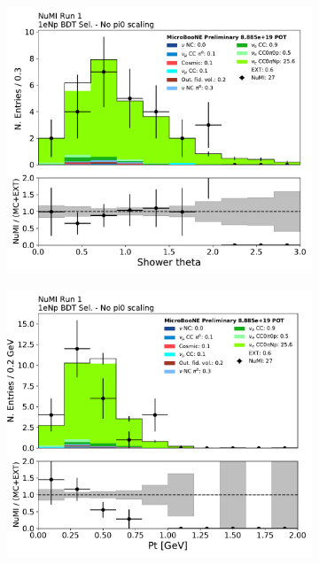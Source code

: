 \begin{figure}[H]
    \centering
    \begin{subfigure}{0.3\textwidth}
    \includegraphics[width=1.0\textwidth]{Sidebands/Figures/NuMI/1eNp/BDTSel/shr_theta.pdf}
    \caption{}
    \end{subfigure}
    \begin{subfigure}{0.3\textwidth}
    \includegraphics[width=1.0\textwidth]{Sidebands/Figures/NuMI/1eNp/BDTSel/pt.pdf}

\end{subfigure}
\end{figure}

